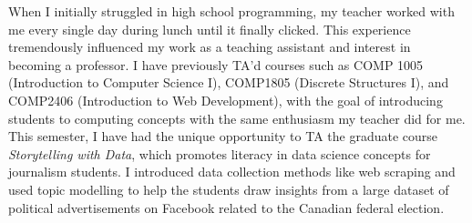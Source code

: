 When I initially struggled in high school programming, my teacher worked with me every single day during lunch until it finally clicked. This experience tremendously influenced my work as a teaching assistant and interest in becoming a professor. I have previously TA'd courses such as COMP 1005 (Introduction to Computer Science I),  COMP1805 (Discrete Structures I), and COMP2406 (Introduction to Web Development), with the goal of introducing students to computing concepts with the same enthusiasm my teacher did for me. This semester, I have had the unique opportunity to TA the graduate course \textit{Storytelling with Data}, which promotes literacy in data science concepts for journalism students. I introduced data collection methods like web scraping and used topic modelling to help the students draw insights from a large dataset of political advertisements on Facebook related to the Canadian federal election.